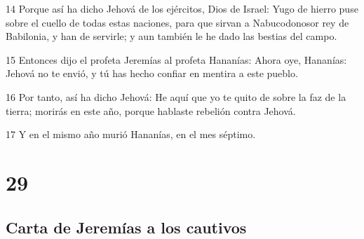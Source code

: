 \par 14 Porque así ha dicho Jehová de los ejércitos, Dios de Israel: Yugo de hierro puse sobre el cuello de todas estas naciones, para que sirvan a Nabucodonosor rey de Babilonia, y han de servirle; y aun también le he dado las bestias del campo.
\par 15 Entonces dijo el profeta Jeremías al profeta Hananías: Ahora oye, Hananías: Jehová no te envió, y tú has hecho confiar en mentira a este pueblo.
\par 16 Por tanto, así ha dicho Jehová: He aquí que yo te quito de sobre la faz de la tierra; morirás en este año, porque hablaste rebelión contra Jehová.
\par 17 Y en el mismo año murió Hananías, en el mes séptimo.

\chapter{29}

\section*{Carta de Jeremías a los cautivos}

